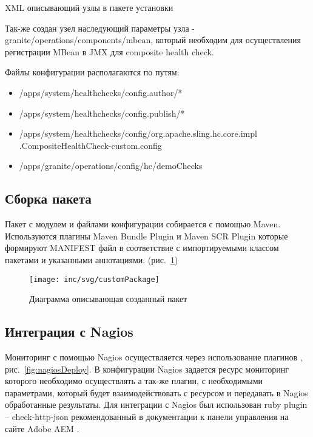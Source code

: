 \begin{listing}[H]
\inputminted[linenos,frame=single]{xml}{inc/src/xmlConfigExample}
\caption{XML описывающий узлы в пакете установки} 
\label{lst:xmlConfigExample}
\end{listing}

Так-же создан узел наследующий параметры узла - granite/operations/components/mbean, который необходим для осуществления регистрации MBean в JMX для composite health check.

Файлы конфигурации располагаются по путям:
\begin{itemize}
\item /apps/system/healthchecks/config.author/*
\item /apps/system/healthchecks/config.publish/*
\item /apps/system/healthchecks/config/org.apache.sling.hc.core.impl .CompositeHealthCheck-custom.config
\item /apps/granite/operations/config/hc/demoChecks
\end{itemize}

\subsection{Сборка пакета}
Пакет с модулем и файлами конфигурации собирается с помощью Maven. Используются плагины Maven Bundle Plugin и Maven SCR Plugin которые формируют MANIFEST файл в соответствие с импортируемыми классом пакетами и указанными аннотациями. (рис.~\ref{fig:customPackage})

\begin{figure}[h]
  \centering
  \texttt{[image: inc/svg/customPackage]}
  \caption{Диаграмма описывающая созданный пакет}
  \label{fig:customPackage}
\end{figure}

\subsection{Интеграция с Nagios}
Мониторинг с помощью Nagios осуществляется через использование плагинов \cite{web:nagiosMonitoringArhitect}, рис.~\ref{fig:nagiosDeploy}. В конфигурации Nagios задается ресурс мониторинг которого необходимо осуществлять а так-же плагин, с необходимыми параметрами, который будет взаимодействовать с ресурсом и передавать в Nagios обработанные результаты. Для интеграции с Nagios был использован ruby plugin – check-http-json \cite{web:nagiosPlugin} рекомендованный в документации к панели управления на сайте Adobe AEM \cite{web:aemDashboard}.

